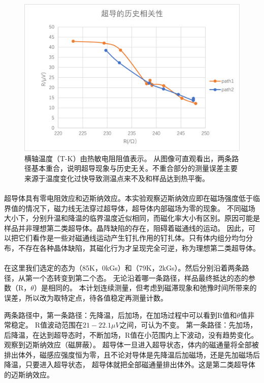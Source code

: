 \documentclass{ctexart}                                     %
\theoremstyle{ansstyle}
\begin{document}
\begin{figure}[H]
    \centering
    \includegraphics[width=1.0\linewidth]{./png/q3.png}
    \caption{横轴温度（T-K）由热敏电阻阻值表示。
        从图像可直观看出，两条路径基本重合，说明超导现象与历史无关。不重合部分的测量误差主要来源于温度变化过快导致测温点来不及和样品达到热平衡。
    }
\end{figure}

\paragraph*{}超导体具有零电阻效应和迈斯纳效应。本实验观察迈斯纳效应即在磁场强度低于临界值的情况下，磁力线无法穿过超导体，超导体内部磁场为零的现象。
不同磁场大小下，分别升温和降温的临界温度近似相同，而磁化率大小有区别。原因可能是样品并非理想第二类超导体。晶阵缺陷的存在，阻碍着磁通线的运动。
因此，可以把它们看作是一些对磁通线运动产生钉扎作用的钉扎体。只有体内组分均匀分布，不存在各种晶体缺陷，其磁化行为才呈现完全可逆，称为理想第二类超导体。
\paragraph{}在这里我们选定的态为（85K，0kGs）和（79K，2kGs）。然后分别沿着两条路径，从第一个态转变到第二个态。
无论沿着哪一条路径，样品最终抵达的态的参数（R，$\theta$）是相同的。
本计划连续测量，但考虑到磁滞现象和弛豫时间所带来的误差，所以改为取特定点，待各值稳定再测量计数。

两条路径中，第一条路径：先降温，后加场，在加场过程中可以看到R值和$\theta$值非常稳定。
R值波动范围在$21-22.1\mu V$之间，可认为不变。
第一条路径：先加场，后降温，在达到超导态时，不断加场，R值在小范围内上下波动，没有趋势变化。观察到迈斯纳效应（磁屏蔽）。
超导体一旦进入超导状态，体内的磁通量将全部被排出体外，磁感应强度恒为零，且不论对导体是先降温后加磁场，还是先加磁场后降温，只要进入超导状态，
超导体就把全部磁通量排出体外。这是第二类超导体的迈斯纳效应。
\end{document}
